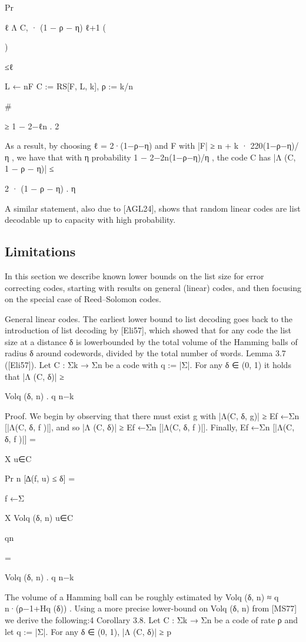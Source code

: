 \documentclass[11pt]{article}
\begin{document}
Pr

ℓ
Λ C,
· (1 − ρ − η)
ℓ+1
(



)

≤ℓ

L ← nF
C := RS[F, L, k], ρ := k/n

\#

≥ 1 − 2−ℓn .
2

As a result, by choosing ℓ = 2·(1−ρ−η)
and F with |F| ≥ n + k · 220(1−ρ−η)/η , we have that with
η
probability 1 − 2−2n(1−ρ−η)/η , the code C has
|Λ (C, 1 − ρ − η)| ≤

2 · (1 − ρ − η)
.
η

A similar statement, also due to [AGL24], shows that random linear codes are list decodable up to
capacity with high probability.


\subsection{Limitations}



In this section we describe known lower bounds on the list size for error correcting codes, starting
with results on general (linear) codes, and then focusing on the special case of Reed–Solomon codes.

General linear codes. The earliest lower bound to list decoding goes back to the introduction
of list decoding by [Eli57], which showed that for any code the list size at a distance δ is lowerbounded by the total volume of the Hamming balls of radius δ around codewords, divided by the
total number of words.
Lemma 3.7 ([Eli57]). Let C : Σk → Σn be a code with q := |Σ|. For any δ ∈ (0, 1) it holds that
|Λ (C, δ)| ≥

Volq (δ, n)
.
q n−k

Proof. We begin by observing that there must exist g with |Λ(C, δ, g)| ≥ Ef ←Σn [|Λ(C, δ, f )|], and
so |Λ (C, δ)| ≥ Ef ←Σn [|Λ(C, δ, f )|]. Finally,
Ef ←Σn [|Λ(C, δ, f )|] =

X
u∈C

Pr n [∆(f, u) ≤ δ] =

f ←Σ

X Volq (δ, n)
u∈C

qn

=

Volq (δ, n)
.
q n−k

The volume of a Hamming ball can be roughly estimated by Volq (δ, n) ≈ q n·(ρ−1+Hq (δ)) . Using
a more precise lower-bound on Volq (δ, n) from [MS77] we derive the following:4
Corollary 3.8. Let C : Σk → Σn be a code of rate ρ and let q := |Σ|. For any δ ∈ (0, 1),
|Λ (C, δ)| ≥ p
\end{document}

